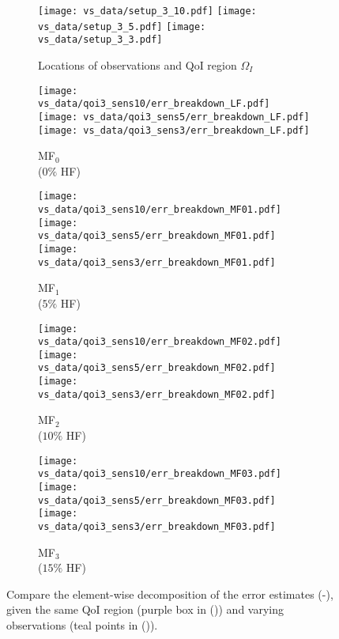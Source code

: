 \begin{figure}
\captionsetup[subfigure]{justification=centering}
\centering
  \begin{subfigure}[t]{0.191\textwidth}
  \centering
    \texttt{[image: vs\_data/setup\_3\_10.pdf]}
    \texttt{[image: vs\_data/setup\_3\_5.pdf]}
    \texttt{[image: vs\_data/setup\_3\_3.pdf]}
    \caption{Locations of observations and QoI region $\Omega_I$}
    \label{subfig:obsSetup}
  \end{subfigure}
  \begin{subfigure}[t]{0.155\textwidth}
  \centering
    \texttt{[image: vs\_data/qoi3\_sens10/err\_breakdown\_LF.pdf]}
    \texttt{[image: vs\_data/qoi3\_sens5/err\_breakdown\_LF.pdf]}
    \texttt{[image: vs\_data/qoi3\_sens3/err\_breakdown\_LF.pdf]}
    \caption{MF$_0$ \\ ($0\%$ HF)}
    \label{subfig:obsLF}
  \end{subfigure}
  \begin{subfigure}[t]{0.155\textwidth}
  \centering
    \texttt{[image: vs\_data/qoi3\_sens10/err\_breakdown\_MF01.pdf]}
    \texttt{[image: vs\_data/qoi3\_sens5/err\_breakdown\_MF01.pdf]}
    \texttt{[image: vs\_data/qoi3\_sens3/err\_breakdown\_MF01.pdf]}
    \caption{MF$_1$ \\ ($5\%$ HF)}
  \end{subfigure}
  \begin{subfigure}[t]{0.155\textwidth}
  \centering
    \texttt{[image: vs\_data/qoi3\_sens10/err\_breakdown\_MF02.pdf]}
    \texttt{[image: vs\_data/qoi3\_sens5/err\_breakdown\_MF02.pdf]}
    \texttt{[image: vs\_data/qoi3\_sens3/err\_breakdown\_MF02.pdf]}
    \caption{MF$_2$ \\ ($10\%$ HF)}
  \end{subfigure}
  \begin{subfigure}[t]{0.245\textwidth}
  \centering
    \texttt{[image: vs\_data/qoi3\_sens10/err\_breakdown\_MF03.pdf]}
    \texttt{[image: vs\_data/qoi3\_sens5/err\_breakdown\_MF03.pdf]}
    \texttt{[image: vs\_data/qoi3\_sens3/err\_breakdown\_MF03.pdf]}
    \caption{MF$_3$ \\ ($15\%$ HF)}
    \label{subfig:obsMFlast}
  \end{subfigure}
  \caption{Compare the element-wise decomposition of the error estimates (-), given the same QoI region (purple box in ()) and varying observations (teal points in ()).}
  \label{fig:dataStudy}
\end{figure}

